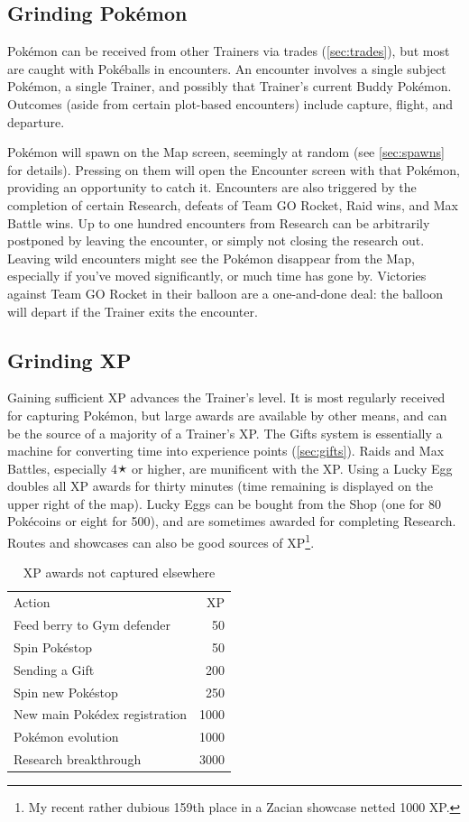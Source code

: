 \subsection{Grinding Pokémon\label{subsec:getmons}}
Pokémon can be received from other Trainers via trades (\autoref{sec:trades}),
  but most are caught with Pokéballs in encounters.
An encounter involves a single subject Pokémon, a single Trainer,
  and possibly that Trainer's current Buddy Pokémon.
Outcomes (aside from certain plot-based encounters) include capture, flight, and departure.

Pokémon will spawn on the Map screen, seemingly at random (see \autoref{sec:spawns} for details).
Pressing on them will open the Encounter screen with that Pokémon,
  providing an opportunity to catch it.
Encounters are also triggered by the completion of certain Research,
  defeats of Team GO Rocket, Raid wins, and Max Battle wins.
Up to one hundred encounters from Research can be arbitrarily postponed by leaving the encounter,
  or simply not closing the research out.
Leaving wild encounters might see the Pokémon disappear from the Map, especially
  if you've moved significantly, or much time has gone by.
Victories against Team GO Rocket in their balloon are a one-and-done deal:
  the balloon will depart if the Trainer exits the encounter.

\subsection{Grinding XP\label{subsec:getxp}}
Gaining sufficient XP advances the Trainer's level.
It is most regularly received for capturing Pokémon, but large awards are
  available by other means, and can be the source of a majority of a Trainer's XP.
The Gifts system is essentially a machine for converting
  time into experience points (\autoref{sec:gifts}).
Raids and Max Battles, especially 4🟉 or higher, are munificent with the XP.
Using a Lucky Egg doubles all XP awards for thirty minutes (time remaining is displayed on the upper right of the map).
Lucky Eggs can be bought from the Shop (one for 80 Pokécoins or eight for 500),
  and are sometimes awarded for completing Research.
Routes and showcases can also be good sources of XP\footnote{My recent rather dubious 159th place in a Zacian showcase netted 1000 XP\@.}.

\begin{table}
\centering
\begin{tabular}{lr}
Action & XP\\
\Midrule
  Feed berry to Gym defender & 50\\
  Spin Pokéstop & 50\\
  Sending a Gift & 200\\
  Spin new Pokéstop & 250\\
  New main Pokédex registration & 1000\\
  Pokémon evolution & 1000\\
  Research breakthrough & 3000\\
\end{tabular}
\caption{XP awards not captured elsewhere\label{table:xpawards}}
\end{table}

